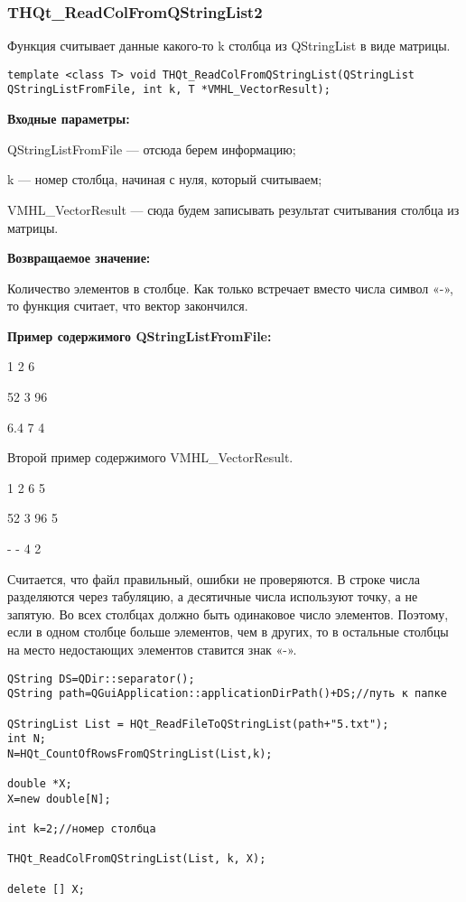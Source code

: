 \documentclass[a4paper,12pt]{article}
\begin{document}
\subsubsection{THQt\_ReadColFromQStringList2}\label{THQt_ReadColFromQStringList2}

Функция считывает данные какого-то k столбца из QStringList в виде матрицы.


\begin{lstlisting}[label=code_syntax_THQt_ReadColFromQStringList2,caption=Синтаксис]
template <class T> void THQt_ReadColFromQStringList(QStringList QStringListFromFile, int k, T *VMHL_VectorResult);
\end{lstlisting}

\textbf{Входные параметры:}

QStringListFromFile --- отсюда берем информацию;

     k --- номер столбца, начиная с нуля, который считываем;
	 
     VMHL\_VectorResult --- сюда будем записывать результат считывания столбца из матрицы.

\textbf{Возвращаемое значение:}

Количество элементов в столбце. Как только встречает вместо числа символ «-», то функция считает, что вектор закончился.

\textbf{Пример содержимого QStringListFromFile:}

1	2	6

52	3	96

6.4	7	4

    Второй пример содержимого VMHL\_VectorResult.
	
1	2	6	5

52	3	96	5

-	-	4   2

Считается, что файл правильный, ошибки не проверяются. В строке числа разделяются через табуляцию, а десятичные числа используют точку, а не запятую. Во всех столбцах должно быть одинаковое число элементов. Поэтому, если в одном столбце больше элементов, чем в других, то в остальные столбцы на место недостающих элементов ставится знак «-».


\begin{lstlisting}[label=code_use_THQt_ReadColFromQStringList2,caption=Пример использования]
QString DS=QDir::separator();
QString path=QGuiApplication::applicationDirPath()+DS;//путь к папке

QStringList List = HQt_ReadFileToQStringList(path+"5.txt");
int N;
N=HQt_CountOfRowsFromQStringList(List,k);

double *X;
X=new double[N];

int k=2;//номер столбца

THQt_ReadColFromQStringList(List, k, X);

delete [] X;
\end{lstlisting}
\end{document}
